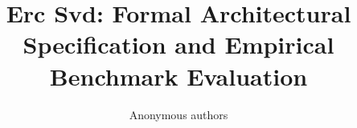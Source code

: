 \title{\textbf{Erc Svd: Formal Architectural Specification and Empirical Benchmark Evaluation}}

\author{Anonymous authors}
